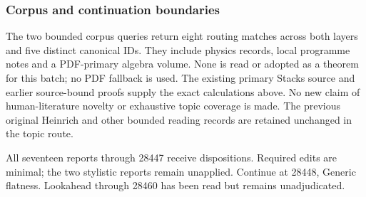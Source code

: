 \subsubsection{Corpus and continuation boundaries}\label{algebra-proof-026-corpus-and-continuation-boundaries}

The two bounded corpus queries return eight routing matches across both layers and five distinct canonical IDs. They include physics records, local programme notes and a PDF-primary algebra volume. None is read or adopted as a theorem for this batch; no PDF fallback is used. The existing primary Stacks source and earlier source-bound proofs supply the exact calculations above. No new claim of human-literature novelty or exhaustive topic coverage is made. The previous original Heinrich and other bounded reading records are retained unchanged in the topic route.

All seventeen reports through 28447 receive dispositions. Required edits are minimal; the two stylistic reports remain unapplied. Continue at 28448, Generic flatness. Lookahead through 28460 has been read but remains unadjudicated.
